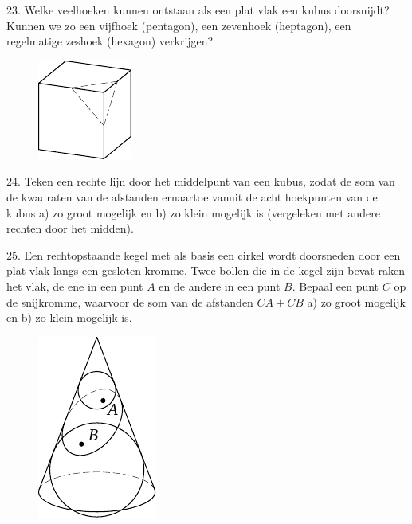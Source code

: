\begin{problem}{23.}
	Welke veelhoeken kunnen ontstaan als een plat vlak een kubus doorsnijdt? Kunnen we zo een vijfhoek (pentagon), een zevenhoek (heptagon), een regelmatige zeshoek (hexagon) verkrijgen?
	\begin{figure}
		\includegraphics{resources/taskbook-7}
	\end{figure}
\end{problem}

\begin{problem}{24.}
	Teken een rechte lijn door het middelpunt van een kubus, zodat de som van de kwadraten van de afstanden ernaartoe vanuit de acht hoekpunten van de kubus a) zo groot mogelijk en b) zo klein mogelijk is (vergeleken met andere rechten door het midden).
\end{problem}

\clearpage

\begin{problem}{25.}
	Een rechtopstaande kegel met als basis een cirkel wordt door\-sneden door een plat vlak langs een gesloten kromme. Twee bollen die in de kegel zijn bevat raken het vlak, de ene in een punt $A$ en de andere in een punt $B$. Bepaal een punt $C$ op de snijkromme, waarvoor de som van de afstanden $CA + CB$ a) zo groot mogelijk en b) zo klein mogelijk is.
	\begin{figure}
		\includegraphics{resources/taskbook-9}
	\end{figure}
\end{problem}

